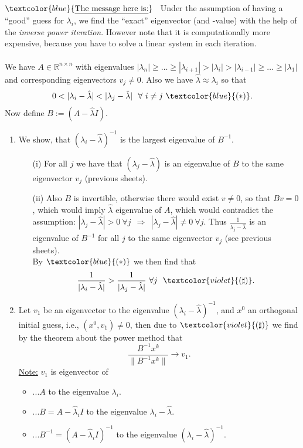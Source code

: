 {\color{solution}
$\textcolor{blue}{\text{\underline{The message here is:}}}$~
Under the assumption of having a ``good'' guess for $\lambda_i$, we find the ``exact'' eigenvector (and -value) with the help of the \textit{inverse power iteration}. However note that it is computationally more expensive, because you have to solve a linear system in each iteration.\\
\\
We have $A\in\mathbb{R}^{n\times n}$ with eigenvalues $|\lambda_n|\geq\dots\geq|\lambda_{i+1}|>|\lambda_i|>|\lambda_{i-1}|\geq\dots\geq|\lambda_1|$ and corresponding eigenvectors $v_j \neq 0$. Also we have $\hat{\lambda}\approx\lambda_i$ so that $$0<|\lambda_i-\hat{\lambda}|<|\lambda_j-\hat{\lambda}|~~\forall~i\neq j~\textcolor{blue}{(*)}.$$
Now define $B:=(A-\hat{\lambda}I)$.
\begin{enumerate}
	\item 
	We show, that $(\lambda_i -\hat{\lambda})^{-1}$ is the largest eigenvalue of $B^{-1}$.
	\begin{itemize}
		\item [(i)] 
		For all $j$ we have that $(\lambda_j-\hat{\lambda})$ is an eigenvalue of $B$ to the same eigenvector $v_j$ (previous sheets).
		\item [(ii)] Also $B$ is invertible, otherwise there would exist $v\neq 0$, so that $Bv=0$, which would imply $\hat{\lambda}$ eigenvalue of $A$, which would contradict the assumption: $|\lambda_j-\hat{\lambda}|>0~\forall j~~\Rightarrow~~|\lambda_j-\hat{\lambda}|\neq 0~\forall j$. Thus $\frac{1}{\lambda_j-\hat{\lambda}}$ is an eigenvalue of $B^{-1}$ for all $j$ to the same  eigenvector $v_j$ (see previous sheets).\\ By $\textcolor{blue}{(*)}$ we then find that $$\frac{1}{|\lambda_i-\hat{\lambda}|}>\frac{1}{|\lambda_j-\hat{\lambda}|}~\forall j ~~\textcolor{violet}{(\sharp)}.$$
	\end{itemize}
	\item 
	Let $v_1$ be an eigenvector to the eigenvalue $(\lambda_i-\hat{\lambda})^{-1}$, and $x^0$ an orthogonal initial guess, i.e., $(x^0,v_1)\neq 0$, then due to $\textcolor{violet}{(\sharp)}$ we find by the theorem about the power method that
	$$
	\frac{B^{-1}x^k}{\|B^{-1}x^k\|}\rightarrow v_1.
	$$
	\underline{Note:} $v_1$ is eigenvector of
	\begin{itemize}
		\item 
		...$A$ to the eigenvalue $\lambda_i$.
		\item 
		...$B=A-\hat{\lambda}_iI$ to the eigenvalue $\lambda_i-\hat{\lambda}$.
		\item 
		...$B^{-1}=(A-\hat{\lambda}_iI)^{-1}$ to the eigenvalue $(\lambda_i-\hat{\lambda})^{-1}$.
	\end{itemize}
\end{enumerate}
}